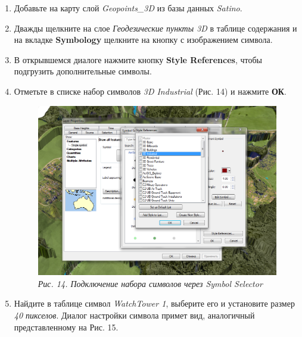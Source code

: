 \documentclass[12pt,]{book}
\begin{document}
\begin{enumerate}
\def\labelenumi{\arabic{enumi}.}
\item
  Добавьте на карту слой \emph{Geopoints\_3D} из базы данных \emph{Satino}.
\item
  Дважды щелкните на слое \emph{Геодезические пункты 3D} в таблице содержания и на вкладке \textbf{Symbology} щелкните на кнопку с изображением символа.
\item
  В открывшемся диалоге нажмите кнопку \textbf{Style References}, чтобы подгрузить дополнительные символы.
\item
  Отметьте в списке набор символов \emph{3D Industrial} (Рис. 14) и нажмите \textbf{ОК}.

  \begin{figure}
  \centering
  \includegraphics{images/Ex18/image16.png}
  \caption{\emph{Рис. 14. Подключение набора символов через Symbol Selector}}
  \end{figure}
\item
  Найдите в таблице символ \emph{WatchTower 1}, выберите его и установите размер \emph{40 пикселов}. Диалог настройки символа примет вид, аналогичный представленному на Рис. 15.


\end{enumerate}
\end{document}
